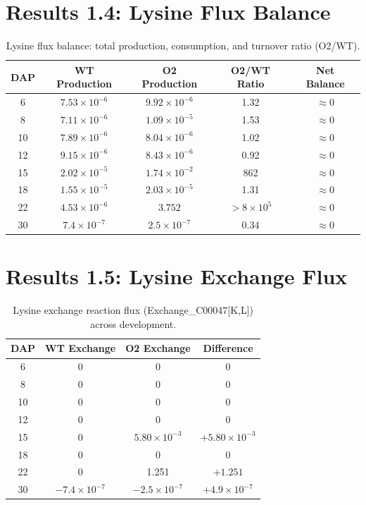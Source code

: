 \documentclass[11pt,letterpaper]{article}
\begin{document}
\clearpage


\section{Results 1.4: Lysine Flux Balance}

\begin{table}[H]
\centering
\caption{Lysine flux balance: total production, consumption, and turnover ratio (O2/WT).}
\label{stab:balance}
\begin{tabular}{ccccc}
\toprule
DAP & WT Production & O2 Production & O2/WT Ratio & Net Balance \\
\midrule
6  & $7.53 \times 10^{-6}$ & $9.92 \times 10^{-6}$ & 1.32   & $\approx 0$ \\
8  & $7.11 \times 10^{-6}$ & $1.09 \times 10^{-5}$ & 1.53   & $\approx 0$ \\
10 & $7.89 \times 10^{-6}$ & $8.04 \times 10^{-6}$ & 1.02   & $\approx 0$ \\
12 & $9.15 \times 10^{-6}$ & $8.43 \times 10^{-6}$ & 0.92   & $\approx 0$ \\
15 & $2.02 \times 10^{-5}$ & $1.74 \times 10^{-2}$ & 862    & $\approx 0$ \\
18 & $1.55 \times 10^{-5}$ & $2.03 \times 10^{-5}$ & 1.31   & $\approx 0$ \\
22 & $4.53 \times 10^{-6}$ & $3.752$               & $>8 \times 10^{5}$ & $\approx 0$ \\
30 & $7.4 \times 10^{-7}$  & $2.5 \times 10^{-7}$  & 0.34   & $\approx 0$ \\
\bottomrule
\end{tabular}
\end{table}

\clearpage


\section{Results 1.5: Lysine Exchange Flux}

\begin{table}[H]
\centering
\caption{Lysine exchange reaction flux (Exchange\_C00047[K,L]) across development.}
\label{stab:exchange}
\begin{tabular}{cccc}
\toprule
DAP & WT Exchange & O2 Exchange & Difference \\
\midrule
6  & 0 & 0 & 0 \\
8  & 0 & 0 & 0 \\
10 & 0 & 0 & 0 \\
12 & 0 & 0 & 0 \\
15 & 0 & $5.80 \times 10^{-3}$ & $+5.80 \times 10^{-3}$ \\
18 & 0 & 0 & 0 \\
22 & 0 & 1.251 & $+1.251$ \\
30 & $-7.4 \times 10^{-7}$ & $-2.5 \times 10^{-7}$ & $+4.9 \times 10^{-7}$ \\
\bottomrule
\end{tabular}
\end{table}
\end{document}
